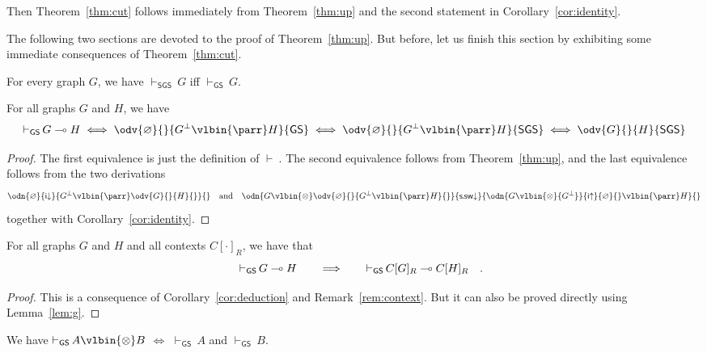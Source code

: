 \documentclass{lmcs} %
\newcommand{\proves}[2][]{\mathord{\vdash_{#1}\,}{#2}}
\def\limp{\multimap}
\renewcommand{\emptyset}{\varnothing}
\def\unit{\emptyset}
\def\GS{\mathsf{GS}}
\def\SGS{\mathsf{SGS}}
\newcommand{\coons}[2]{[#1]_{#2}}														%
\newcommand{\quand}{\quad\mbox{and}\quad}
\newcommand{\quadfs}{\rlap{\quad.}}
\def\idr{\dirule}
\def\iur{\uirule}
\def\ssdr{\dssrule}
\def\cneg#1{{#1^\bot}}
\def\lpar{\vlbin{\parr}}
\def\ltens{\vlbin{\otimes}}
\def\irule{\mathsf{i}}
\def\dirule{\irule\mathord{\downarrow}}
\def\uirule{\irule\mathord{\uparrow}}
\def\ssrule{\mathsf{s\mkern-1mu.\mkern-1mu sw}}
\def\dssrule{\ssrule\mathord{\downarrow}}
\def\gC{C}
\def\gG{G}
\def\gH{H}
\theoremstyle{plain}
\begin{document}
Then Theorem~\ref{thm:cut} follows immediately from
Theorem~\ref{thm:up} and the second statement in
Corollary~\ref{cor:identity}.

The following two sections are devoted to the proof of
Theorem~\ref{thm:up}. But before, let us finish this section by
exhibiting some immediate consequences of Theorem~\ref{thm:cut}.

\begin{cor}\label{cor:gs-sgs}
  For every graph $\gG$, we have $\proves[\SGS]\gG$ iff $\proves[\GS]\gG$. 
\end{cor}

\begin{cor}\label{cor:deduction}
  For all graphs $G$ and $H$, we have
  \begin{equation*}
    \proves[\GS]{\gG\limp\gH}
    \iff
    \odv{\unit}{}{\cneg\gG\lpar\gH}{\GS}
    \iff
    \odv{\unit}{}{\cneg\gG\lpar\gH}{\SGS}
    \iff
    \odv{\gG}{}{\gH}{\SGS}
  \end{equation*}
\end{cor}

\begin{proof}
  The first equivalence is just the definition of $\proves{}$. The
  second equivalence follows from Theorem~\ref{thm:up}, and the last equivalence follows from the two derivations
  \begin{equation*}
    \odn{\unit}{
      \idr}{
      \cneg\gG\lpar
      \odv{\gG}{}{\gH}{}}{}
    \quand
    \odn{\gG\ltens
      \odv{\unit}{}{\cneg\gG\lpar\gH}{}}{
      \ssdr}{
      \odn{\gG\ltens\cneg\gG}{\iur}{\unit}{}
      \lpar
      \gH}{}
  \end{equation*}
  together with Corollary~\ref{cor:identity}.
\end{proof}

\begin{cor}\label{cor:context}
  For all graphs $\gG$ and $\gH$ and all contexts $\gC\coons{\cdot}R$, we have that
  $$
  \text{$
  	\proves[\GS]{\gG\limp\gH}\qquad\Longrightarrow\qquad
    \proves[\GS]{\gC\coons{\gG}R\limp\gC\coons{\gH}R}
    $}\quadfs
  $$
\end{cor}

\begin{proof}
  This is a consequence of Corollary~\ref{cor:deduction} and
  Remark~\ref{rem:context}. But it can also be proved directly using
  Lemma~\ref{lem:g}.
\end{proof}

\begin{cor}\label{cor:tensor}
  We have\;\; $\proves[\GS]{A\ltens B}$ \;\;$\iff$\/\;\; $\proves[\GS]{A}$ \;and\/\; $\proves[\GS]{B}$.
\end{cor}
\end{document}
